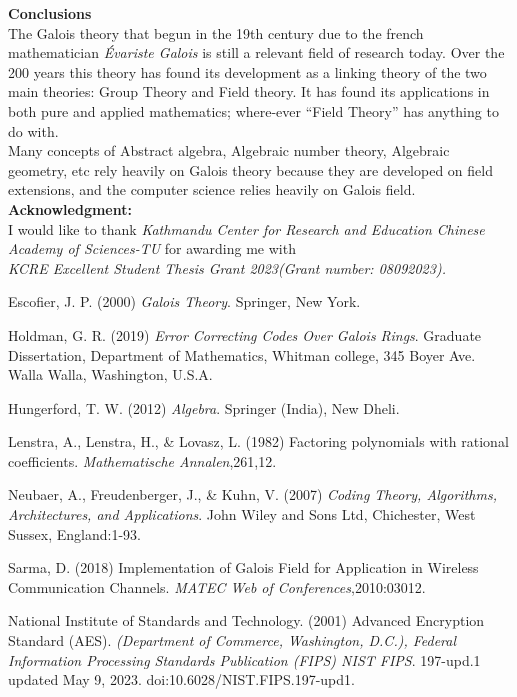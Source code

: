 \documentclass[a4paper,twoside,10pt]{article}
\theoremstyle{plain}
\theoremstyle{definition}
\begin{document}
\vspace{5mm}
\textbf{Conclusions}\\
The Galois theory that begun in the 19th century due to the french mathematician \textit{Évariste Galois} is still a relevant field of research today. Over the 200 years this theory has found its development as a linking theory of the two main theories: Group Theory and Field theory. It has found its applications in both pure and applied mathematics; where-ever ``Field Theory'' has anything to do with.\\
Many concepts of Abstract algebra, Algebraic number theory, Algebraic geometry, etc rely heavily on Galois theory because they are developed on field extensions, and the computer science relies heavily on Galois field.\\

\clearpage
\textbf{Acknowledgment:} \\
I would like to thank \textit{Kathmandu Center for Research and Education Chinese Academy of Sciences-TU} for awarding me with \\
\textit{KCRE Excellent Student Thesis Grant 2023(Grant number: 08092023).}
\vspace{7mm}



\begin{thebibliography}{9}
Escofier, J. P. (2000) \emph{Galois Theory}. Springer, New York.

Holdman, G. R. (2019) \emph{Error Correcting Codes  Over Galois Rings}. Graduate Dissertation, Department of Mathematics, Whitman college, 345 Boyer Ave.
Walla Walla, Washington, U.S.A.

Hungerford, T. W. (2012) \emph{Algebra}. Springer (India), New Dheli.

Lenstra, A., Lenstra, H.,  \& Lovasz, L. (1982)  Factoring polynomials with rational coefficients. \emph{Mathematische Annalen},261,12.

Neubaer, A.,  Freudenberger, J.,  \& Kuhn, V. (2007) \emph{Coding Theory, Algorithms, Architectures, and Applications}. John Wiley and Sons Ltd, Chichester, West Sussex, England:1-93.

Sarma, D. (2018) Implementation of Galois Field for Application in Wireless Communication Channels. \emph{MATEC Web of Conferences},2010:03012.

National Institute of Standards and Technology. (2001) Advanced Encryption
Standard (AES). \emph{(Department of Commerce, Washington, D.C.), Federal Information Processing Standards Publication (FIPS) NIST FIPS}. 197-upd.1 updated May 9, 2023. doi:10.6028/NIST.FIPS.197-upd1.

\end{thebibliography}
\end{document}
